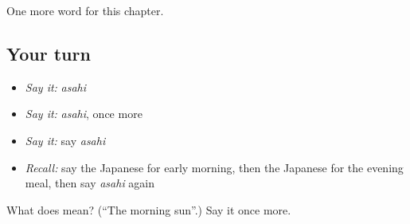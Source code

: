 \begin{grammarlens}[title={What you've built}]
One more word for this chapter.
\end{grammarlens}

\subsection*{Your turn}
\begin{itemize}
\raggedright
  \item \emph{Say it:} \emph{asahi}
  \item \emph{Say it:} \emph{asahi}, once more
  \item \emph{Say it:} say \emph{asahi}
  \item \emph{Recall:} say the Japanese for early morning, then the Japanese for the evening meal, then say \emph{asahi} again
\end{itemize}

\begin{tcolorbox}[breakable,colback=teal!4,colframe=teal!35!black,title={Before you move on}]
What does  mean? (\textquotedblleft{}The morning sun\textquotedblright{}.) Say it once more.
\end{tcolorbox}
